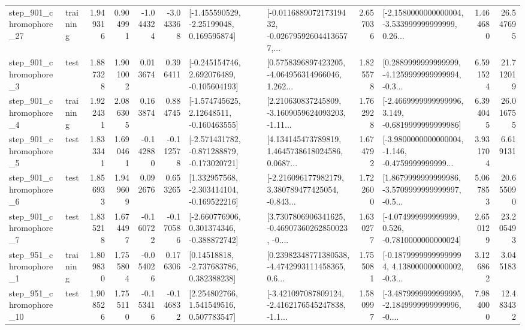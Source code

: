 \begin{tabular}{llrrrrllrlrr}
  step\_901\_chromophore\_27 &  training &      1.949316 &    0.904991 &     -1.044324 & -3.043368 &    [-1.455590529, -2.25199048, 0.169595874] &  [-0.011688907217319432, -0.026795926044136577,... &       2.657036 &  [-2.1580000000000004, -3.533999999999999, 0.26... &            1.464680 &         26.547695 \\
   step\_901\_chromophore\_3 &      test &      1.887328 &    1.901002 &      0.013674 &  0.396411 &   [-0.245154746, 2.692076489, -0.105604193] &  [0.5758396897423205, -4.064956314966046, 1.262... &       1.825578 &  [0.2889999999999999, -4.1259999999999994, -0.3... &            6.591524 &         21.712019 \\
   step\_901\_chromophore\_4 &  training &      1.922431 &    2.086305 &      0.163874 &  0.884745 &    [-1.574745625, 2.12648511, -0.160463555] &  [2.210630837245809, -3.1609059624093203, -1.11... &       1.762928 &  [-2.4669999999999996, 3.149, -0.6819999999999986] &            6.394045 &         26.016755 \\
   step\_901\_chromophore\_5 &      test &      1.833341 &    1.690461 &     -0.142880 & -0.112578 &  [-2.571431782, -0.871288879, -0.173020721] &  [4.134145473789819, 1.4645738618024586, 0.0687... &       1.674792 &  [-3.9800000000000004, -1.146, -0.4759999999999... &            3.931704 &          6.619131 \\
   step\_901\_chromophore\_6 &      test &      1.856933 &    1.949609 &      0.092676 &  0.653265 &   [1.332957568, -2.303414104, -0.169522216] &  [-2.216096177982179, 3.380789477425054, -0.843... &       1.722600 &  [1.8679999999999986, -3.5709999999999997, -0.5... &            5.067853 &         20.655090 \\
   step\_901\_chromophore\_7 &      test &      1.835218 &    1.674497 &     -0.160722 & -0.170586 &   [-2.660776906, 0.301374346, -0.388872742] &  [3.7307806906341625, -0.46907360262850023, -0.... &       1.630277 &   [-4.074999999999999, 0.526, -0.7810000000000024] &            2.650129 &         23.205493 \\
   step\_951\_chromophore\_1 &  training &      1.809830 &    1.755804 &     -0.054026 &  0.176306 &     [0.14518818, -2.737683786, 0.382388238] &  [0.23982348771380538, -4.4742993111458365, 0.6... &       1.755081 &  [-0.18799999999999994, 4.138000000000002, -0.3... &            3.126862 &          3.045183 \\
  step\_951\_chromophore\_10 &      test &      1.908526 &    1.755110 &     -0.153416 & -0.146832 &     [2.254802766, 1.541549516, 0.507783547] &  [-3.421097087809124, -2.4162176545247838, -1.1... &       1.580997 &  [-3.4879999999999995, -2.1849999999999996, -0.... &            7.984000 &         12.483432 \\

\end{tabular}
